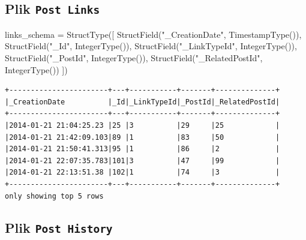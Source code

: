 \documentclass[
  letterpaper,
  DIV=11,
  numbers=noendperiod]{scrreprt}
\newenvironment{Shaded}{\begin{snugshade}}{\end{snugshade}}
\newcommand{\NormalTok}[1]{\textcolor[rgb]{0.00,0.23,0.31}{#1}}
\newcommand{\OperatorTok}[1]{\textcolor[rgb]{0.37,0.37,0.37}{#1}}
\newcommand{\StringTok}[1]{\textcolor[rgb]{0.13,0.47,0.30}{#1}}
\begin{document}
\normalsize

\hypertarget{plik-post-links}{%
\subsection{\texorpdfstring{Plik
\texttt{Post\ Links}}{Plik Post Links}}\label{plik-post-links}}

\small

\begin{Shaded}
\begin{Highlighting}[]
\NormalTok{links\_schema }\OperatorTok{=}\NormalTok{ StructType([}
\NormalTok{    StructField(}\StringTok{"\_CreationDate"}\NormalTok{, TimestampType()),}
\NormalTok{    StructField(}\StringTok{"\_Id"}\NormalTok{, IntegerType()),}
\NormalTok{    StructField(}\StringTok{"\_LinkTypeId"}\NormalTok{, IntegerType()),}
\NormalTok{    StructField(}\StringTok{"\_PostId"}\NormalTok{, IntegerType()),}
\NormalTok{    StructField(}\StringTok{"\_RelatedPostId"}\NormalTok{, IntegerType())}
\NormalTok{])}
\end{Highlighting}
\end{Shaded}

\begin{verbatim}
+-----------------------+---+-----------+-------+--------------+
|_CreationDate          |_Id|_LinkTypeId|_PostId|_RelatedPostId|
+-----------------------+---+-----------+-------+--------------+
|2014-01-21 21:04:25.23 |25 |3          |29     |25            |
|2014-01-21 21:42:09.103|89 |1          |83     |50            |
|2014-01-21 21:50:41.313|95 |1          |86     |2             |
|2014-01-21 22:07:35.783|101|3          |47     |99            |
|2014-01-21 22:13:51.38 |102|1          |74     |3             |
+-----------------------+---+-----------+-------+--------------+
only showing top 5 rows
\end{verbatim}

\normalsize

\hypertarget{plik-post-history}{%
\subsection{\texorpdfstring{Plik
\texttt{Post\ History}}{Plik Post History}}\label{plik-post-history}}

\small
\end{document}
